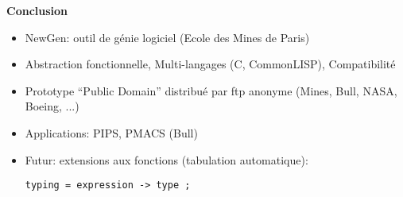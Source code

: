 \documentclass[11pt]{article}
\newcommand{\newgen}{NewGen}
\begin{document}
{\newpage

\begin{center}
{\huge\bf Conclusion}
\end{center}

\vskip 2cm

\begin{itemize}
\item \newgen: outil de génie logiciel (Ecole des Mines de Paris)
\item Abstraction fonctionnelle, Multi-langages (C, CommonLISP),
Compatibilité 
\item Prototype ``Public Domain'' distribué par ftp anonyme (Mines,
Bull, NASA, Boeing, ...)
\item Applications: PIPS, PMACS (Bull)
\item Futur: extensions aux fonctions (tabulation automatique):

\begin{verbatim}
typing = expression -> type ;
\end{verbatim}
\end{itemize}

}
\end{document}
